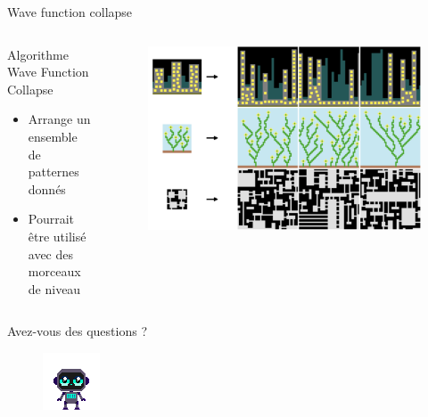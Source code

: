 \documentclass{beamer}
\begin{document}
{\begin{frame}{Wave function collapse}
    \begin{columns}
        \begin{block}{Algorithme Wave Function Collapse}
            \begin{itemize}
                \item[\bullet] Arrange un ensemble de patternes donnés
                \item[\bullet] Pourrait être utilisé avec des morceaux de niveau
            \end{itemize}
        \end{block}
        \begin{figure}
            \centering
            \includegraphics[width=1.0\textwidth]{wfc-examples}
        \end{figure}
    \end{columns}
\end{frame}

}

\begin{frame}
    \centering
    Avez-vous des questions ?
    \begin{figure}
        \centering
        \includegraphics[width=0.5\linewidth]{character_placeholder}
    \end{figure}
\end{frame}
\end{document}
